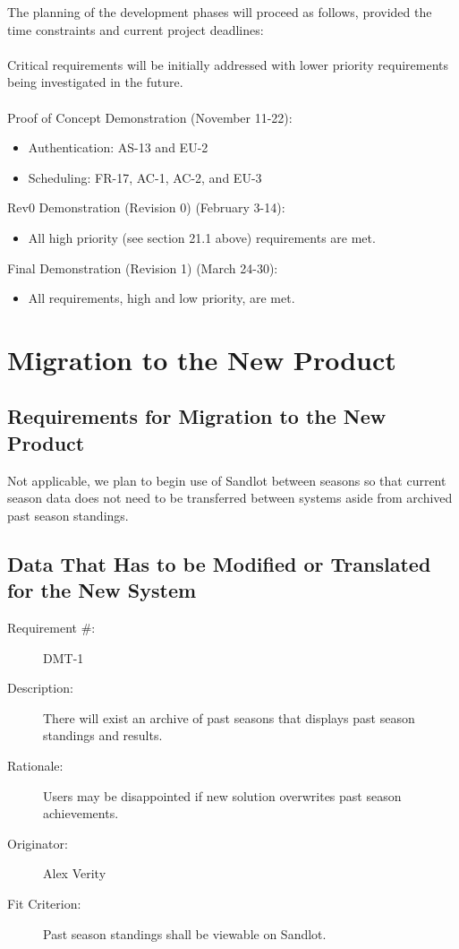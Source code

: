 \documentclass[12pt]{article}
\newenvironment{myreq}[1]{%
\setlist[description]{font=\normalfont\color{darkgray}}%
\begin{tcolorbox}[colframe=black,colback=white, sharp corners, boxrule=1pt]%
\bfseries\color{blue}%
\begin{description}#1}%
{\end{description}\end{tcolorbox}}
\newcommand{\twoinline}[2]{\begin{multicols}{2}#1 #2\end{multicols}}
\newcommand{\reqno}{\item[Requirement \#:]}
\newcommand{\reqdesc}{\item[Description:]}
\newcommand{\reqrat}{\item[Rationale:]}
\newcommand{\reqorig}{\item[Originator:]}
\newcommand{\reqfit}{\item[Fit Criterion:]}
\newcommand{\reqsatis}{\item[Customer Satisfaction:]}
\newcommand{\reqdissat}{\item[Customer Dissatisfaction:]}
\begin{document}
The planning of the development phases will proceed as follows, provided the time
constraints and current project deadlines: \\\\
Critical requirements will be initially addressed with lower priority requirements
being investigated in the future. \\\\

Proof of Concept Demonstration (November 11-22):
\begin{itemize}
  \item Authentication: AS-13 and EU-2
  \item Scheduling: FR-17, AC-1, AC-2, and EU-3
\end{itemize}

Rev0 Demonstration (Revision 0) (February 3-14):
\begin{itemize}
  \item All high priority (see section 21.1 above) requirements are met.
\end{itemize}

Final Demonstration (Revision 1) (March 24-30):
\begin{itemize}
  \item All requirements, high and low priority, are met.
\end{itemize}

\section{Migration to the New Product}
\subsection{Requirements for Migration to the New Product}
Not applicable, we plan to begin use of Sandlot between seasons so that
current season data does not need to be transferred between systems aside from
archived past season standings.

\subsection{Data That Has to be Modified or Translated for the New System}

\begin{myreq}
  \reqno DMT-1
  \reqdesc There will exist an archive of past seasons that displays past
  season standings and results.
  \reqrat Users may be disappointed if new solution overwrites past season
  achievements.
  \reqorig Alex Verity
  \reqfit Past season standings shall be viewable on Sandlot.
  \twoinline
    {\reqsatis 1}
    {\reqdissat 2}
\end{myreq}
\end{document}
